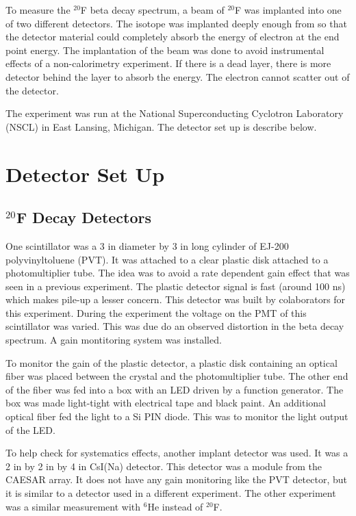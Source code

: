 

To measure the $^{20}$F beta decay spectrum, a beam of $^{20}$F was implanted into one of two different detectors.
The isotope was implanted deeply enough from so that the detector material could completely absorb the energy of electron at the end point energy.
The implantation of the beam was done to avoid instrumental effects of a non-calorimetry experiment.
If there is a dead layer, there is more detector behind the layer to absorb the energy.
The electron cannot scatter out of the detector.

The experiment was run at the National Superconducting Cyclotron Laboratory (NSCL) in East Lansing, Michigan. 
The detector set up is describe below.

\section{Detector Set Up}

\subsection{$^{20}$F Decay Detectors}
One scintillator was a 3 in diameter by 3 in long cylinder of EJ-200 polyvinyltoluene (PVT).
It was attached to a clear plastic disk attached to a photomultiplier tube.
The idea was to avoid a rate dependent gain effect that was seen in a previous experiment.
The plastic detector signal is fast (around 100 ns) which makes pile-up a lesser concern.
This detector was built by colaborators for this experiment.
During the experiment the voltage on the PMT of this scintillator was varied.
This was due do an observed distortion in the beta decay spectrum.
A gain montitoring system was installed.

To monitor the gain of the plastic detector, a plastic disk containing an optical fiber was placed between the crystal and the photomultiplier tube. 
The other end of the fiber was fed into a box with an LED driven by a function generator. 
The box was made light-tight with electrical tape and black paint.
An additional optical fiber fed the light to a Si PIN diode.
This was to monitor the light output of the LED.

To help check for systematics effects, another implant detector was used.
It was a 2 in by 2 in by 4 in  CsI(Na) detector. 
This detector was a module from the CAESAR array.
It does not have any gain monitoring like the PVT detector, but it is similar to a detector used in a different experiment. 
The other experiment was a similar measurement with $^{6}$He instead of $^{20}$F.

